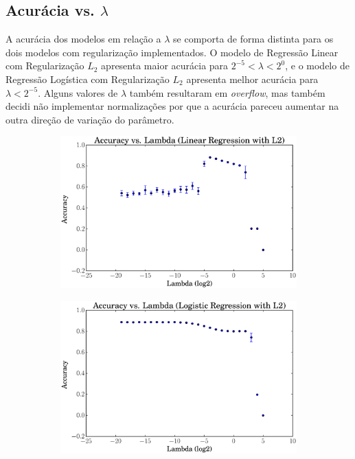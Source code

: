 \documentclass[a4paper, 12pt]{article}
\begin{document}
\newpage
\subsection{Acurácia vs. $\lambda$}

A acurácia dos modelos em relação a $\lambda$ se comporta de forma distinta
para os dois modelos com regularização implementados. O modelo de Regressão
Linear com Regularização $L_2$ apresenta maior acurácia para $2^{-5} < \lambda
< 2^{0}$, e o modelo de Regressão Logística com Regularização $L_2$ apresenta
melhor acurácia para $\lambda < 2^{-5}$. Alguns valores de $\lambda$ também
resultaram em \textit{overflow}, mas também decidi não implementar
normalizações por que a acurácia pareceu aumentar na outra direção de variação
do parâmetro.

\begin{figure}[htpb]
    \centering
    \begin{subfigure}[htpb]{0.45\textwidth}
        \includegraphics[width=\textwidth]{acc_vs_lambda_linregL2}
        \caption{}
        \label{fig:lambda_linregL2}
    \end{subfigure}
    \begin{subfigure}[htpb]{0.45\textwidth}
        \includegraphics[width=\textwidth]{acc_vs_lambda_logregL2}

\end{subfigure}
\end{figure}
\end{document}
